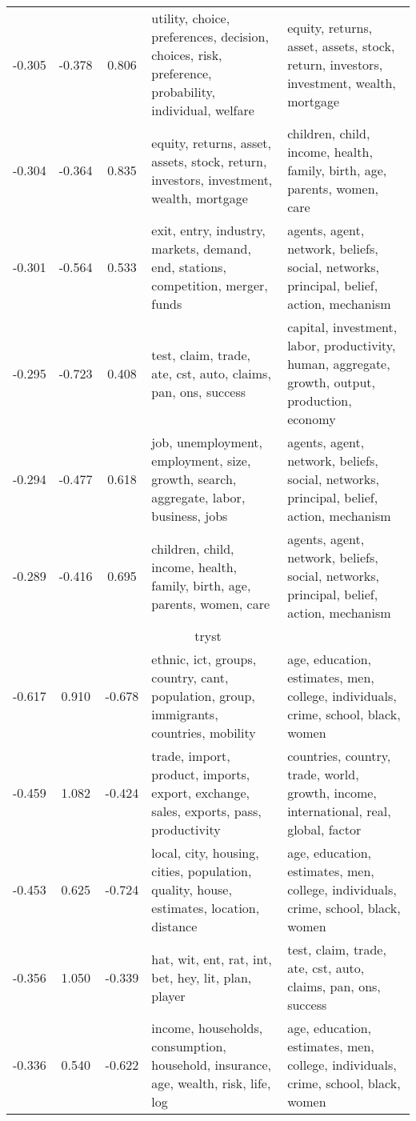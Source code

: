\begin{tabular}{cccp{5cm}p{5cm}}
-0.305 & -0.378 & 0.806 & utility, choice, preferences, decision, choices, risk, preference, probability, individual, welfare & equity, returns, asset, assets, stock, return, investors, investment, wealth, mortgage \\
-0.304 & -0.364 & 0.835 & equity, returns, asset, assets, stock, return, investors, investment, wealth, mortgage & children, child, income, health, family, birth, age, parents, women, care \\
-0.301 & -0.564 & 0.533 & exit, entry, industry, markets, demand, end, stations, competition, merger, funds & agents, agent, network, beliefs, social, networks, principal, belief, action, mechanism \\
-0.295 & -0.723 & 0.408 & test, claim, trade, ate, cst, auto, claims, pan, ons, success & capital, investment, labor, productivity, human, aggregate, growth, output, production, economy \\
-0.294 & -0.477 & 0.618 & job, unemployment, employment, size, growth, search, aggregate, labor, business, jobs & agents, agent, network, beliefs, social, networks, principal, belief, action, mechanism \\
-0.289 & -0.416 & 0.695 & children, child, income, health, family, birth, age, parents, women, care & agents, agent, network, beliefs, social, networks, principal, belief, action, mechanism \\
\midrule
\multicolumn{5}{c}{tryst}\\
-0.617 & 0.910 & -0.678 & ethnic, ict, groups, country, cant, population, group, immigrants, countries, mobility & age, education, estimates, men, college, individuals, crime, school, black, women \\
-0.459 & 1.082 & -0.424 & trade, import, product, imports, export, exchange, sales, exports, pass, productivity & countries, country, trade, world, growth, income, international, real, global, factor \\
-0.453 & 0.625 & -0.724 & local, city, housing, cities, population, quality, house, estimates, location, distance & age, education, estimates, men, college, individuals, crime, school, black, women \\
-0.356 & 1.050 & -0.339 & hat, wit, ent, rat, int, bet, hey, lit, plan, player & test, claim, trade, ate, cst, auto, claims, pan, ons, success \\
-0.336 & 0.540 & -0.622 & income, households, consumption, household, insurance, age, wealth, risk, life, log & age, education, estimates, men, college, individuals, crime, school, black, women \\

\end{tabular}
